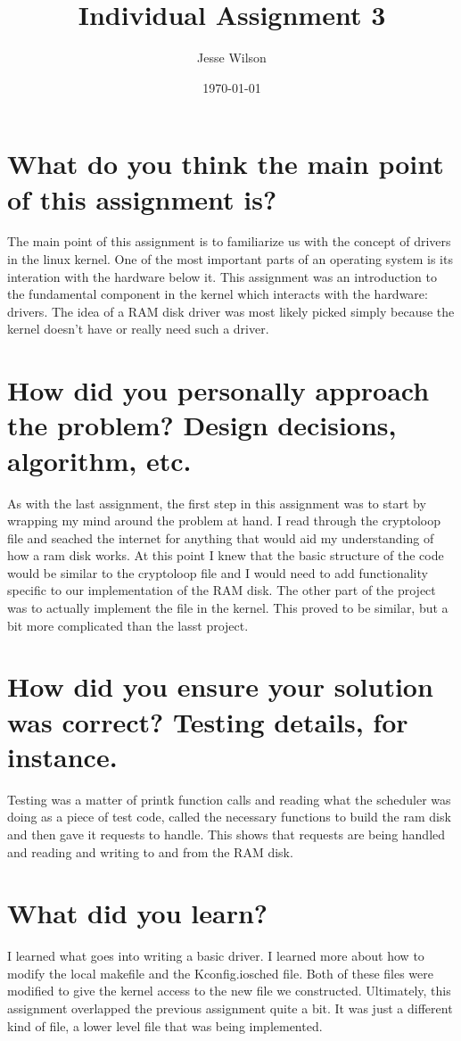 \documentclass[a4paper]{article}
\title{Individual Assignment 3}
\author{Jesse Wilson}
\date{\today}
\begin{document}
\maketitle

\section{What do you think the main point of this assignment is?}

The main point of this assignment is to familiarize us with the concept of drivers in the linux kernel. One of the most important parts of an operating system is its interation with the hardware below it. This assignment was an introduction to the fundamental component in the kernel which interacts with the hardware: drivers. The idea of a RAM disk driver was most likely picked simply because the kernel doesn't have or really need such a driver.


\section{How did you personally approach the problem? Design decisions, algorithm, etc.}

As with the last assignment, the first step in this assignment was to start by wrapping my mind around the problem at hand. I read through the cryptoloop file and seached the internet for anything that would aid my understanding of how a ram disk works. At this point I knew that the basic structure of the code would be similar to the cryptoloop file and I would need to add functionality specific to our implementation of the RAM disk. The other part of the project was to actually implement the file in the kernel. This proved to be similar, but a bit more complicated than the lasst project.


\section{How did you ensure your solution was correct? Testing details, for instance.}

Testing was a matter of printk function calls and reading what the scheduler was doing as a piece of test code, called the necessary functions to build the ram disk and then gave it requests to handle. This shows that requests are being handled and reading and writing to and from the RAM disk.

\section{What did you learn?}

I learned what goes into writing a basic driver. I learned more about how to modify the local makefile and the Kconfig.iosched file. Both of these files were modified to give the kernel access to the new file we constructed. Ultimately, this assignment overlapped the previous assignment quite a bit. It was just a different kind of file, a lower level file that was being implemented. 
\end{document}
